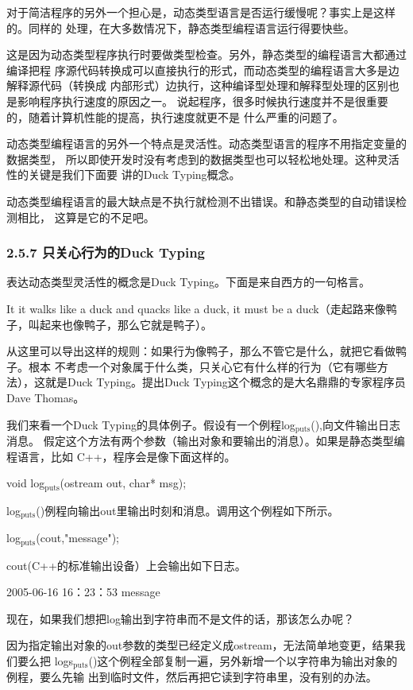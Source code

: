 \documentclass[11pt]{ctexart}
\begin{document}
对于简洁程序的另外一个担心是，动态类型语言是否运行缓慢呢？事实上是这样的。同样的
处理，在大多数情况下，静态类型编程语言运行得要快些。

这是因为动态类型程序执行时要做类型检查。另外，静态类型的编程语言大都通过编译把程
序源代码转换成可以直接执行的形式，而动态类型的编程语言大多是边解释源代码（转换成
内部形式）边执行，这种编译型处理和解释型处理的区别也是影响程序执行速度的原因之一。
说起程序，很多时候执行速度并不是很重要的，随着计算机性能的提高，执行速度就更不是
什么严重的问题了。

动态类型编程语言的另外一个特点是灵活性。动态类型语言的程序不用指定变量的数据类型，
所以即使开发时没有考虑到的数据类型也可以轻松地处理。这种灵活性的关键是我们下面要
讲的Duck Typing概念。

动态类型编程语言的最大缺点是不执行就检测不出错误。和静态类型的自动错误检测相比，
这算是它的不足吧。
\subsubsection{2.5.7 只关心行为的Duck Typing}
\label{sec:org1918359}

表达动态类型灵活性的概念是Duck Typing。下面是来自西方的一句格言。

It it walks like a duck and quacks like a duck, it must be a duck（走起路来像鸭
子，叫起来也像鸭子，那么它就是鸭子）。

从这里可以导出这样的规则：如果行为像鸭子，那么不管它是什么，就把它看做鸭子。根本
不考虑一个对象属于什么类，只关心它有什么样的行为（它有哪些方法），这就是Duck
Typing。提出Duck Typing这个概念的是大名鼎鼎的专家程序员Dave Thomas。

我们来看一个Duck Typing的具体例子。假设有一个例程log\(_{\text{puts}}\)(),向文件输出日志消息。
假定这个方法有两个参数（输出对象和要输出的消息）。如果是静态类型编程语言，比如
C++，程序会是像下面这样的。

void log\(_{\text{puts}}\)(ostream out, char* msg);

log\(_{\text{puts}}\)()例程向输出out里输出时刻和消息。调用这个例程如下所示。

log\(_{\text{puts}}\)(cout,"message");

cout(C++的标准输出设备）上会输出如下日志。

2005-06-16 16：23：53 message

现在，如果我们想把log输出到字符串而不是文件的话，那该怎么办呢？

因为指定输出对象的out参数的类型已经定义成ostream，无法简单地变更，结果我们要么把
logs\(_{\text{puts}}\)()这个例程全部复制一遍，另外新增一个以字符串为输出对象的例程，要么先输
出到临时文件，然后再把它读到字符串里，没有别的办法。
\end{document}
